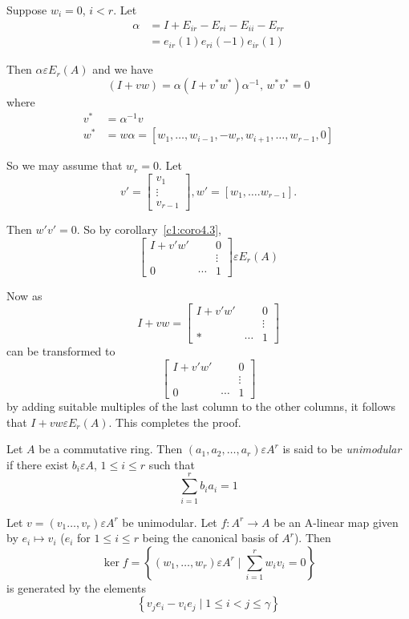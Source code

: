 \begin{Proof}
Suppose $w_i=0$, $i<r$. Let 
\begin{align*}
\alpha&=I+E_{ir}-E_{ri}-E_{ii}-E_{rr}\\
&= e_{ir}(1)e_{ri}(-1)e_{ir}(1)
\end{align*}

Then $\alpha \varepsilon E_r(A)$ and we have
$$
(I+vw)=\alpha(I+v^{\ast}w^{\ast})\alpha^{-1},\, w^{\ast}v^{\ast}=0
$$
where
\begin{align*}
v^{\ast}&=\alpha^{-1}v\\
w^{\ast}&=w\alpha=[w_1,\ldots,w_{i-1},-w_r,w_{i+1},\ldots,w_{r-1},0]
\end{align*}

So we may assume that $w_r=0$. Let 
$$
v'=
\begin{bmatrix}
v_1\\
\vdots\\
v_{r-1}
\end{bmatrix}, w'=[w_1,\ldots.w_{r-1}].
$$

Then $w'v'=0$. So by corollary~\ref{c1:coro4.3},
$$
\begin{bmatrix}
I+v'w' & &0\\
& & \vdots\\
0 & \cdots & 1
\end{bmatrix} \varepsilon E_r(A)
$$

Now as
$$
I+vw=
\begin{bmatrix}
I+v'w' & & 0\\
& & \vdots\\
\ast & \cdots & 1
\end{bmatrix}
$$
can be transformed to 
$$
\begin{bmatrix}
I+v'w' && 0\\
& & \vdots\\
0 & \cdots & 1
\end{bmatrix}
$$
by adding suitable multiples of the last column to the other columns,
it follows that $I+vw \varepsilon E_r(A)$. This completes the proof.
\enprf
\end{Proof}


\begin{dfn}\label{c1:dfn4.5}
Let $A$ be a commutative ring. Then $(a_1,a_2,\ldots,a_r)\varepsilon
A^{r}$ is said to be \textit{unimodular} if there exist
$b_i\varepsilon A$, $1\leq i \leq r$ such that 
$$
\sum\limits_{i=1}^{r}b_ia_i=1
$$
\end{dfn}

\begin{lem}\label{c1:lem4.6}
Let $v=(v_1\ldots,v_r)\varepsilon A^{r}$ be unimodular. Let
$f:A^{r}\rightarrow A$ be an A-linear map given by $e_i\mapsto v_i$
($e_i$ for $1\leq i \leq r$ being the canonical basis of
$A^{r}$). Then 
$$
\ker f=\left\{(w_1,\ldots,w_r)\varepsilon A^{r}\mid
\sum\limits_{i=1}^{r} w_iv_i=0\right\}
$$
is generated by the elements
$$
\left\{v_je_i-v_ie_j\mid 1\leq i <j\leq \gamma\right\}
$$
\end{lem}

